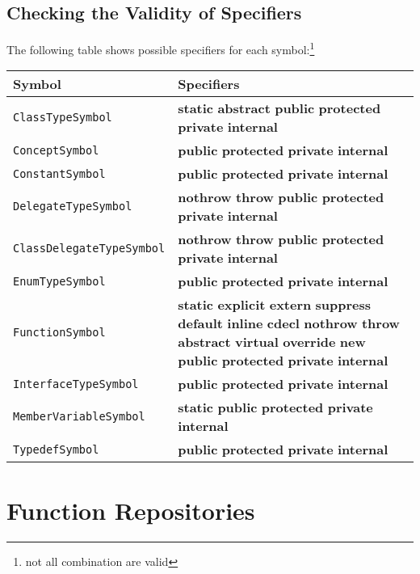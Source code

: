 \documentclass[a4paper,oneside,11pt]{book}
\theoremstyle{definition}
\begin{document}
\section{Checking the Validity of Specifiers}

The following table shows possible specifiers for each symbol:\footnote{not all combination are valid}

\begin{flushleft}
\begin{supertabular}{lp{10cm}}
\textbf{Symbol}& \textbf{Specifiers}\\
\hline
\verb|ClassTypeSymbol|& \textbf{static} \textbf{abstract} \textbf{public} \textbf{protected} \textbf{private} \textbf{internal}\\
\verb|ConceptSymbol|& \textbf{public} \textbf{protected} \textbf{private} \textbf{internal}\\
\verb|ConstantSymbol|& \textbf{public} \textbf{protected} \textbf{private} \textbf{internal}\\
\verb|DelegateTypeSymbol|& \textbf{nothrow} \textbf{throw} \textbf{public} \textbf{protected} \textbf{private} \textbf{internal}\\
\verb|ClassDelegateTypeSymbol|& \textbf{nothrow} \textbf{throw} \textbf{public} \textbf{protected} \textbf{private} \textbf{internal}\\
\verb|EnumTypeSymbol|& \textbf{public} \textbf{protected} \textbf{private} \textbf{internal}\\
\verb|FunctionSymbol|&
\textbf{static} \textbf{explicit} \textbf{extern} \textbf{suppress} \textbf{default} \textbf{inline} \textbf{cdecl} \textbf{nothrow} \textbf{throw}
\textbf{abstract} \textbf{virtual} \textbf{override} \textbf{new}
\textbf{public} \textbf{protected} \textbf{private} \textbf{internal}\\
\verb|InterfaceTypeSymbol|& \textbf{public} \textbf{protected} \textbf{private} \textbf{internal}\\
\verb|MemberVariableSymbol|& \textbf{static} \textbf{public} \textbf{protected} \textbf{private} \textbf{internal}\\
\verb|TypedefSymbol|& \textbf{public} \textbf{protected} \textbf{private} \textbf{internal}\\
\hline
\end{supertabular}
\end{flushleft}

\chapter{Function Repositories}\label{functionrepositories}
\end{document}
